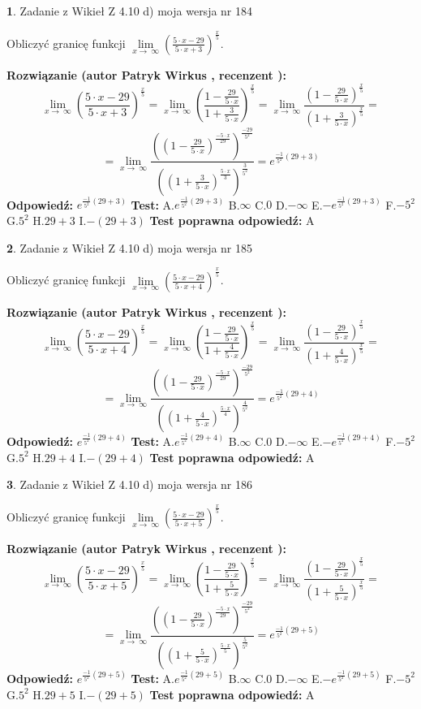 \documentclass[12pt, a4paper]{article}
\theoremstyle{definition} %
\newtheorem{zad}{}
\newcommand{\zadStart}[1]{\begin{zad}#1\newline}
\newcommand{\zadStop}{\end{zad}}
\newcommand{\rozwStart}[2]{\noindent \textbf{Rozwiązanie (autor #1 , recenzent #2): }\newline}
\newcommand{\rozwStop}{\newline}
\newcommand{\odpStart}{\noindent \textbf{Odpowiedź:}\newline}
\newcommand{\odpStop}{\newline}
\newcommand{\testStart}{\noindent \textbf{Test:}\newline}
\newcommand{\testStop}{\newline}
\newcommand{\kluczStart}{\noindent \textbf{Test poprawna odpowiedź:}\newline}
\newcommand{\kluczStop}{\newline}
\begin{document}
\zadStart{Zadanie z Wikieł Z 4.10 d) moja wersja nr 184}


Obliczyć granicę funkcji  $\lim\limits_{x\to\ \infty}(\frac{5\cdot x-29}{5\cdot x+3})^{\frac{x}{5}}$.
\zadStop
\rozwStart{Patryk Wirkus}{}
$$\lim\limits_{x\to\ \infty}(\frac{5\cdot x-29}{5\cdot x+3})^{\frac{x}{5}} = \lim\limits_{x\to\ \infty}(\frac{1-\frac{29}{5\cdot x}}{1+\frac{3}{5\cdot x}})^{\frac{x}{5}}=\lim\limits_{x\to\ \infty}\frac{(1-\frac{29}{5\cdot x})^{\frac{x}{5}}}{(1+\frac{3}{5\cdot x})^{\frac{x}{5}}}=$$
$$=\lim\limits_{x\to\ \infty}\frac{((1-\frac{29}{5\cdot x})^{\frac{-5\cdot x}{29}})^{\frac{-29}{5^{2}}}}{((1+\frac{3}{5\cdot x})^{\frac{5\cdot x}{3}})^{\frac{3}{5^{2}}}}=e^{\frac{-1}{5^{2}}(29+3)}$$
\rozwStop
\odpStart
$e^{\frac{-1}{5^{2}}(29+3)}$
\odpStop
\testStart
A.$e^{\frac{-1}{5^{2}}(29+3)}$ B.$\infty$ C.$0$ D.$-\infty$ E.$-e^{\frac{-1}{5^{2}}(29+3)}$
F.$-5^{2}$ G.$5^{2}$
H.$29+3$
I.$-(29+3)$
\testStop
\kluczStart
A
\kluczStop



\zadStart{Zadanie z Wikieł Z 4.10 d) moja wersja nr 185}


Obliczyć granicę funkcji  $\lim\limits_{x\to\ \infty}(\frac{5\cdot x-29}{5\cdot x+4})^{\frac{x}{5}}$.
\zadStop
\rozwStart{Patryk Wirkus}{}
$$\lim\limits_{x\to\ \infty}(\frac{5\cdot x-29}{5\cdot x+4})^{\frac{x}{5}} = \lim\limits_{x\to\ \infty}(\frac{1-\frac{29}{5\cdot x}}{1+\frac{4}{5\cdot x}})^{\frac{x}{5}}=\lim\limits_{x\to\ \infty}\frac{(1-\frac{29}{5\cdot x})^{\frac{x}{5}}}{(1+\frac{4}{5\cdot x})^{\frac{x}{5}}}=$$
$$=\lim\limits_{x\to\ \infty}\frac{((1-\frac{29}{5\cdot x})^{\frac{-5\cdot x}{29}})^{\frac{-29}{5^{2}}}}{((1+\frac{4}{5\cdot x})^{\frac{5\cdot x}{4}})^{\frac{4}{5^{2}}}}=e^{\frac{-1}{5^{2}}(29+4)}$$
\rozwStop
\odpStart
$e^{\frac{-1}{5^{2}}(29+4)}$
\odpStop
\testStart
A.$e^{\frac{-1}{5^{2}}(29+4)}$ B.$\infty$ C.$0$ D.$-\infty$ E.$-e^{\frac{-1}{5^{2}}(29+4)}$
F.$-5^{2}$ G.$5^{2}$
H.$29+4$
I.$-(29+4)$
\testStop
\kluczStart
A
\kluczStop



\zadStart{Zadanie z Wikieł Z 4.10 d) moja wersja nr 186}


Obliczyć granicę funkcji  $\lim\limits_{x\to\ \infty}(\frac{5\cdot x-29}{5\cdot x+5})^{\frac{x}{5}}$.
\zadStop
\rozwStart{Patryk Wirkus}{}
$$\lim\limits_{x\to\ \infty}(\frac{5\cdot x-29}{5\cdot x+5})^{\frac{x}{5}} = \lim\limits_{x\to\ \infty}(\frac{1-\frac{29}{5\cdot x}}{1+\frac{5}{5\cdot x}})^{\frac{x}{5}}=\lim\limits_{x\to\ \infty}\frac{(1-\frac{29}{5\cdot x})^{\frac{x}{5}}}{(1+\frac{5}{5\cdot x})^{\frac{x}{5}}}=$$
$$=\lim\limits_{x\to\ \infty}\frac{((1-\frac{29}{5\cdot x})^{\frac{-5\cdot x}{29}})^{\frac{-29}{5^{2}}}}{((1+\frac{5}{5\cdot x})^{\frac{5\cdot x}{5}})^{\frac{5}{5^{2}}}}=e^{\frac{-1}{5^{2}}(29+5)}$$
\rozwStop
\odpStart
$e^{\frac{-1}{5^{2}}(29+5)}$
\odpStop
\testStart
A.$e^{\frac{-1}{5^{2}}(29+5)}$ B.$\infty$ C.$0$ D.$-\infty$ E.$-e^{\frac{-1}{5^{2}}(29+5)}$
F.$-5^{2}$ G.$5^{2}$
H.$29+5$
I.$-(29+5)$
\testStop
\kluczStart
A
\kluczStop
\end{document}
